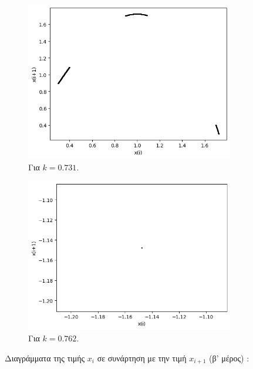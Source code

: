 \begin{figure}[h!]
\begin{subfigure}[b]{0.4\textwidth}
		\includegraphics[width=\textwidth]{LateX images/graphs q12/g11}
		\caption{Για $k=0.731$.}
		\label{f:k67}
	\end{subfigure}
	\hfill
	\begin{subfigure}[b]{0.4\textwidth}
		\centering
		\includegraphics[width=\textwidth]{LateX images/graphs q12/g12}
		\caption{Για $k=0.762$.}
		\label{f:k68}
	\end{subfigure}
	\hfill
\caption{Διαγράμματα της τιμής \(x_i\) σε συνάρτηση με την τιμή \(x_{i+1}\) (β' μέρος) :}	
\end{figure}

\clearpage


